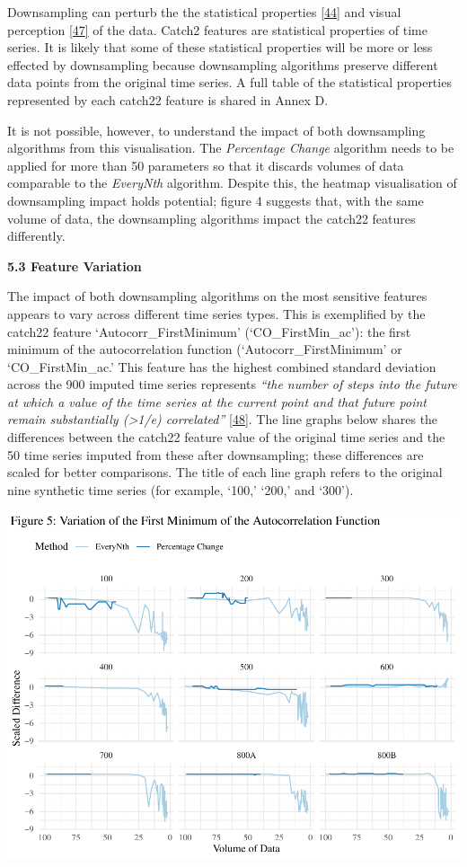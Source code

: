 \documentclass{article}
\begin{document}
Downsampling can perturb the the statistical properties
\protect\hyperlink{ref-ATIChangePoint}{{[}44{]}} and visual perception
\protect\hyperlink{ref-graphsampling}{{[}47{]}} of the data. Catch2
features are statistical properties of time series. It is likely that
some of these statistical properties will be more or less effected by
downsampling because downsampling algorithms preserve different data
points from the original time series. A full table of the statistical
properties represented by each catch22 feature is shared in Annex D.

It is not possible, however, to understand the impact of both
downsampling algorithms from this visualisation. The \emph{Percentage
Change} algorithm needs to be applied for more than 50 parameters so
that it discards volumes of data comparable to the \emph{EveryNth}
algorithm. Despite this, the heatmap visualisation of downsampling
impact holds potential; figure 4 suggests that, with the same volume of
data, the downsampling algorithms impact the catch22 features
differently.

\newpage

\textbf{5.3 Feature Variation}

The impact of both downsampling algorithms on the most sensitive
features appears to vary across different time series types. This is
exemplified by the catch22 feature `Autocorr\_FirstMinimum'
(`CO\_FirstMin\_ac'): the first minimum of the autocorrelation function
(`Autocorr\_FirstMinimum' or `CO\_FirstMin\_ac.' This feature has the
highest combined standard deviation across the 900 imputed time series
represents \emph{``the number of steps into the future at which a value
of the time series at the current point and that future point remain
substantially (\textgreater1/e) correlated''}
\protect\hyperlink{ref-feature_book}{{[}48{]}}. The line graphs below
shares the differences between the catch22 feature value of the original
time series and the 50 time series imputed from these after
downsampling; these differences are scaled for better comparisons. The
title of each line graph refers to the original nine synthetic time
series (for example, `100,' `200,' and `300').

\includegraphics{210431461_CSC8639_Dissertation_files/figure-latex/FirstMinimum-1.pdf}
\end{document}
